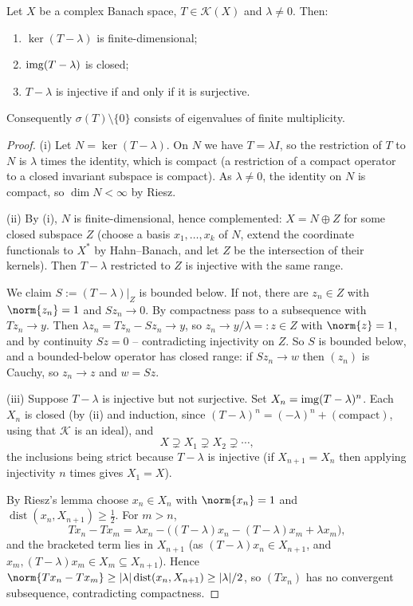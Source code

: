 \documentclass[a4paper]{scrartcl}
\newcommand{\Kop}{\mathcal{K}}
\DeclareMathOperator{\dist}{dist}
\begin{document}
\begin{theorem}
	Let $X$ be a complex Banach space, $T\in\Kop(X)$ and $\lambda\neq0$. Then:
	\begin{enumerate}[label=(\roman*)]
		\item $\ker(T-\lambda)$ is finite-dimensional;
		\item $\operatorname{img}(T-\lambda)$ is closed;
		\item $T - \lambda$ is injective if and only if it is surjective.
	\end{enumerate}
	Consequently $\sigma(T)\setminus\{0\}$ consists of eigenvalues of finite multiplicity.
\end{theorem}

\begin{proof}
	(i) Let $N = \ker(T-\lambda)$. On $N$ we have $T = \lambda I$, so the restriction of $T$ to $N$ is $\lambda$ times the identity, which is compact (a restriction of a compact operator to a closed invariant subspace is compact). As $\lambda\neq0$, the identity on $N$ is compact, so $\dim N<\infty$ by Riesz.

	(ii) By (i), $N$ is finite-dimensional, hence complemented: $X = N\oplus Z$ for some closed subspace $Z$ (choose a basis $x_1,\dots,x_k$ of $N$, extend the coordinate functionals to $X^*$ by Hahn--Banach, and let $Z$ be the intersection of their kernels). Then $T - \lambda$ restricted to $Z$ is injective with the same range.

	We claim $S := (T-\lambda)|_Z$ is bounded below. If not, there are $z_n\in Z$ with $\norm{z_n}=1$ and $Sz_n\to0$. By compactness pass to a subsequence with $Tz_n \to y$. Then $\lambda z_n = Tz_n - Sz_n \to y$, so $z_n \to y/\lambda =: z \in Z$ with $\norm{z}=1$, and by continuity $Sz = 0$ -- contradicting injectivity on $Z$. So $S$ is bounded below, and a bounded-below operator has closed range: if $Sz_n \to w$ then $(z_n)$ is Cauchy, so $z_n\to z$ and $w = Sz$.

	(iii) Suppose $T-\lambda$ is injective but not surjective. Set $X_n = \operatorname{img}(T-\lambda)^n$. Each $X_n$ is closed (by (ii) and induction, since $(T-\lambda)^n = (-\lambda)^n + (\text{compact})$, using that $\Kop$ is an ideal), and
	$$X \supsetneq X_1\supsetneq X_2 \supsetneq\cdots,$$
	the inclusions being strict because $T-\lambda$ is injective (if $X_{n+1}=X_n$ then applying injectivity $n$ times gives $X_1 = X$).

	By Riesz's lemma choose $x_n\in X_n$ with $\norm{x_n}=1$ and $\dist(x_n, X_{n+1})\geq\frac12$. For $m>n$,
	$$Tx_n - Tx_m = \lambda x_n - \big( (T-\lambda)x_n - (T-\lambda)x_m + \lambda x_m \big),$$
	and the bracketed term lies in $X_{n+1}$ (as $(T-\lambda)x_n \in X_{n+1}$, and $x_m, (T-\lambda)x_m \in X_m \subseteq X_{n+1}$). Hence $\norm{Tx_n - Tx_m}\geq|\lambda|\dist(x_n,X_{n+1})\geq|\lambda|/2$, so $(Tx_n)$ has no convergent subsequence, contradicting compactness.


\end{proof}
\end{document}
